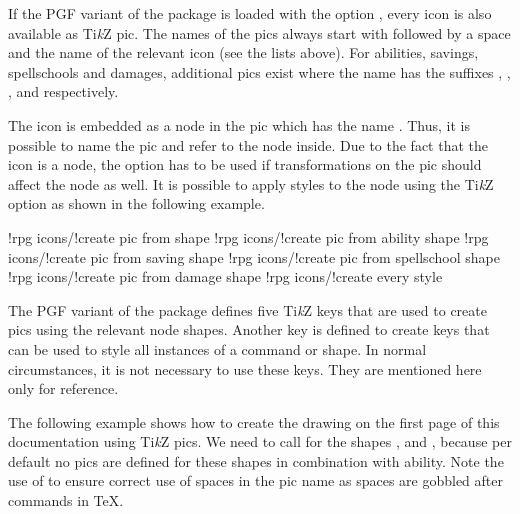 \documentclass[a4paper]{article}
\begin{document}
If the PGF variant of the package is loaded with the option , every icon is also available as Ti\emph{k}Z pic. The names of the pics always start with  followed by a space and the name of the relevant icon (see the lists above). For abilities, savings, spellschools and damages, additional pics exist where the name has the suffixes , , , and  respectively.

The icon is embedded as a node in the pic which has the name . Thus, it is possible to name the pic and refer to the node inside. Due to the fact that the icon is a node, the option  has to be used if transformations on the pic should affect the node as well. It is possible to apply styles to the node using the Ti\emph{k}Z option  as shown in the following example.

\begin{codeexample}
\end{codeexample}

\begin{macrodef}
!rpg icons/!create pic from shape
!rpg icons/!create pic from ability shape
!rpg icons/!create pic from saving shape
!rpg icons/!create pic from spellschool shape
!rpg icons/!create pic from damage shape
!rpg icons/!create every style
\end{macrodef}
The PGF variant of the package defines five Ti\emph{k}Z keys that are used to create pics using the relevant node shapes. Another key is defined to create keys that can be used to style all instances of a command or shape. In normal circumstances, it is not necessary to use these keys. They are mentioned here only for reference.

The following example shows how to create the drawing on the first page of this documentation using Ti\emph{k}Z pics. We need to call  for the shapes ,  and , because per default no pics are defined for these shapes in combination with ability. Note the use of \macro{\space} to ensure correct use of spaces in the pic name as spaces are gobbled after commands in TeX.
\end{document}

